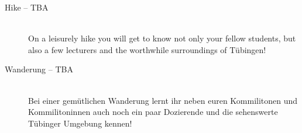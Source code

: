 \begin{description}

\ifml
	\item[Hike -- TBA]~\\
	On a leisurely hike you will get to know not only your fellow students,
	but also a few lecturers and the worthwhile surroundings of Tübingen!
\else
	\item[Wanderung -- TBA]~\\
	Bei einer gemütlichen Wanderung lernt ihr neben euren Kommilitonen und Kommilitoninnen auch
	noch ein paar Dozierende und die sehenswerte Tübinger Umgebung kennen!
\fi



\end{description}
